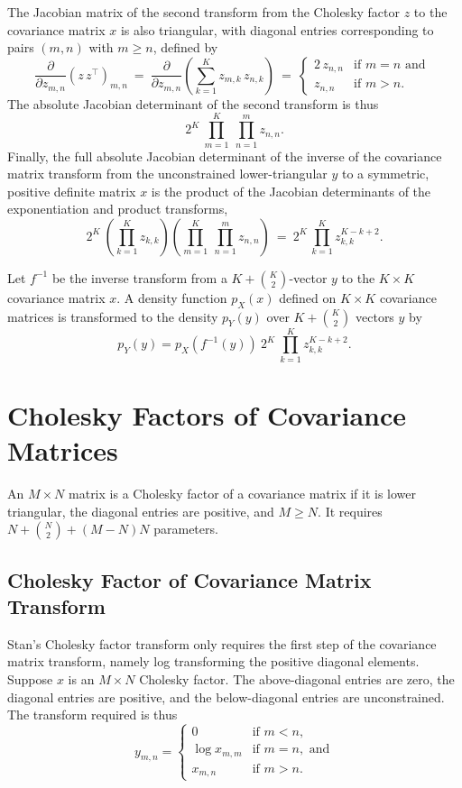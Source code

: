 The Jacobian matrix of the second transform from the Cholesky factor $z$ to
the covariance matrix $x$ is also triangular, with diagonal entries
corresponding to pairs $(m,n)$ with $m \geq n$, defined by
\[
\frac{\partial}{\partial z_{m,n}}
\left( z \, z^{\top} \right)_{m,n}
\ = \
\frac{\partial}{\partial z_{m,n}}
\left( \sum_{k=1}^K z_{m,k} \, z_{n,k} \right)
\ = \
\left\{
\begin{array}{cl}
2 \, z_{n,n} & \mbox{if } m = n \mbox{ and }
\\[4pt]
z_{n,n} & \mbox{if } m > n.
\end{array}
\right.
\]
%
The absolute Jacobian determinant of the second transform is thus
\[
2^{K} 
\
\prod_{m = 1}^{K} \ \prod_{n=1}^{m} z_{n,n}.
\]
Finally, the full absolute Jacobian determinant of the inverse
of the covariance matrix transform from the unconstrained lower-triangular 
$y$ to a symmetric, positive definite matrix $x$ is the product of the
Jacobian determinants of the exponentiation and product transforms,
\[
2^{K} 
\
\left( \prod_{k=1}^K z_{k,k} \right)
\left( \prod_{m = 1}^{K} \ \prod_{n=1}^{m} z_{n,n} \right)
\ = \
2^K
\, \prod_{k=1}^K z_{k,k}^{K-k+2}.
\]

Let $f^{-1}$ be the inverse transform from a $K + \binom{K}{2}$-vector
$y$ to the $K \times K$ covariance matrix $x$.  A density function
$p_X(x)$ defined on $K \times K$ covariance matrices is transformed to
the density $p_Y(y)$ over $K + \binom{K}{2}$ vectors $y$ by
\[
p_Y(y) = p_X(f^{-1}(y)) \ 2^K \ \prod_{k=1}^K z_{k,k}^{K-k+2}.
\]

\section{Cholesky Factors of Covariance Matrices}

An $M \times N$ matrix is a Cholesky factor of a covariance matrix
if it is lower triangular, the diagonal entries are positive, and $M
\geq N$.  It requires $N + \binom{N}{2} + (M - N)N$ parameters.

\subsection{Cholesky Factor of Covariance Matrix Transform}

Stan's Cholesky factor transform only requires the first step of the
covariance matrix transform, namely log transforming the positive
diagonal elements.  Suppose $x$ is an $M \times N$ Cholesky factor.
The above-diagonal entries are zero, the diagonal entries are
positive, and the below-diagonal entries are unconstrained.  The
transform required is thus
%
\[
y_{m,n} = 
\left\{
\begin{array}{cl}
0 & \mbox{if } m < n,
\\[4pt]
\log x_{m,m} & \mbox{if } m = n, \mbox{ and}
\\[4pt]
x_{m,n} & \mbox{if } m > n.
\end{array}
\right.
\]

